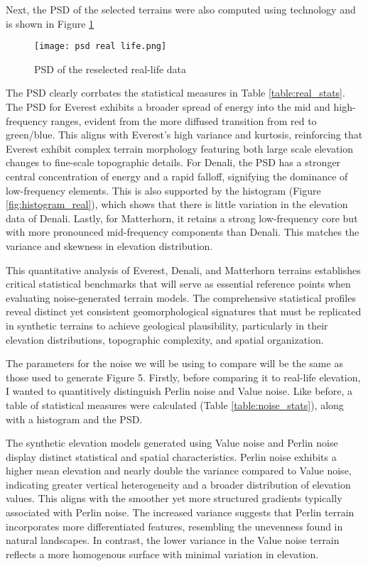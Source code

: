 Next, the PSD of the selected terrains were also computed using technology and is shown in Figure \ref{fig:PSD_real}
\begin{figure}[H]
    \centering
    \texttt{[image: psd real life.png]}
    \caption{PSD of the reselected real-life data}
    \label{fig:PSD_real}
\end{figure}
The PSD clearly corrbates the statistical measures in Table \ref{table:real_stats}. The PSD for Everest exhibits a broader spread of energy into the mid and high-frequency ranges, evident from the more 
diffused transition from red to green/blue. This aligns with Everest's high variance and kurtosis, reinforcing that Everest exhibit complex terrain morphology featuring both large scale 
elevation changes to fine-scale topographic details. For Denali, the PSD has a stronger central concentration of energy and a rapid falloff, signifying the dominance of low-frequency elements. 
This is also supported by the histogram (Figure \ref{fig:histogram_real}), which shows that there is little variation in the elevation data of Denali. Lastly, for Matterhorn, it retains a strong low-frequency core 
but with more pronounced mid-frequency components than Denali. This matches the variance and skewness in elevation distribution.

This quantitative analysis of Everest, Denali, and Matterhorn terrains establishes critical statistical benchmarks that will serve as essential reference points when evaluating noise-generated 
terrain models. The comprehensive statistical profiles reveal distinct yet consistent geomorphological signatures that must be replicated in synthetic terrains to achieve geological plausibility, 
particularly in their elevation distributions, topographic complexity, and spatial organization.

The parameters for the noise we will be using to compare will be the same as those used to generate Figure 5. Firstly, before comparing it to real-life elevation, I wanted to quantitively 
distinguish Perlin noise and Value noise. Like before, a table of statistical measures were calculated (Table \ref{table:noise_stats}), along with a histogram and the PSD. 

The synthetic elevation models generated using Value noise and Perlin noise display distinct statistical and spatial characteristics. Perlin noise exhibits a higher mean elevation and nearly double 
the variance compared to Value noise, indicating greater vertical heterogeneity and a broader distribution of elevation values. This aligns with the smoother yet more structured gradients typically 
associated with Perlin noise. The increased variance suggests that Perlin terrain incorporates more differentiated features, resembling the unevenness found in natural landscapes. In contrast, the 
lower variance in the Value noise terrain reflects a more homogenous surface with minimal variation in elevation.

